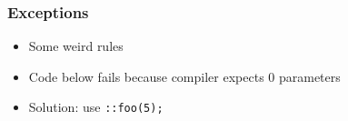 \documentclass{../ucll-slides}
\begin{document}
\begin{frame}
  \frametitle{Exceptions}
  \begin{itemize}
    \item Some weird rules
    \item Code below fails because compiler expects 0 parameters
    \item Solution: use {\tt ::foo(5);}
  \end{itemize}
\end{frame}



\end{document}
